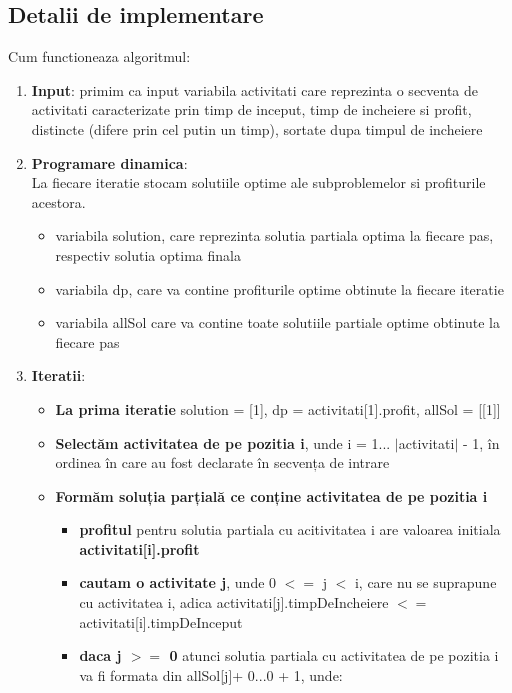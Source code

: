 \subsection{Detalii de implementare}

Cum functioneaza algoritmul:
\begin{enumerate}
    \item \textbf{Input}: primim ca input variabila activitati care reprezinta o secventa de activitati caracterizate prin timp de inceput, timp de incheiere si profit,  distincte (difere prin cel putin un timp), sortate dupa timpul de incheiere
    \item \textbf{Programare dinamica}: \\
    La fiecare iteratie stocam solutiile optime ale subproblemelor si profiturile acestora.
    \begin{itemize}
        \item variabila solution, care reprezinta solutia partiala optima la fiecare pas, respectiv solutia optima finala 
        \item variabila dp, care va contine profiturile optime obtinute la fiecare iteratie
        \item  variabila allSol care va contine toate solutiile partiale optime obtinute la fiecare pas
    \end{itemize} 
    \item \textbf{Iteratii}: 
    \begin{itemize}
        \item \textbf{La prima iteratie} solution = [1], dp = activitati[1].profit, allSol = [[1]] 
        \item \textbf{Selectăm activitatea de pe pozitia i}, unde i = 1... $|$activitati$|$ - 1, în ordinea în care au fost declarate în secvența de intrare
        \item \textbf{Formăm soluția parțială ce conține activitatea de pe pozitia i}
        \begin{itemize}
            \item \textbf{profitul} pentru solutia partiala cu acitivitatea i are valoarea initiala \textbf{activitati[i].profit}
            \item \textbf{cautam o activitate j}, unde 0 $<$$=$ j $<$ i, care nu se suprapune cu activitatea i, adica activitati[j].timpDeIncheiere $<$$=$activitati[i].timpDeInceput
            \item \textbf{daca j $>$$=$ 0} atunci solutia partiala cu activitatea de pe pozitia i va fi formata din 
            allSol[j]+ 0...0 + 1, unde:

\end{itemize}
\end{itemize}
\end{enumerate}

